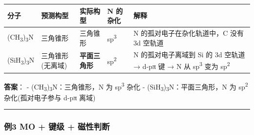 {\def\LTcaptype{none} %
\begin{longtable}[]{@{}
  >{\raggedright\arraybackslash}p{}
  >{\raggedright\arraybackslash}p{}
  >{\raggedright\arraybackslash}p{}
  >{\centering\arraybackslash}p{}
  >{\raggedright\arraybackslash}p{}@{}}
\toprule\noalign{}
\begin{minipage}[b]{\linewidth}\raggedright
分子
\end{minipage} & \begin{minipage}[b]{\linewidth}\raggedright
预测构型
\end{minipage} & \begin{minipage}[b]{\linewidth}\raggedright
实际构型
\end{minipage} & \begin{minipage}[b]{\linewidth}\centering
N 的杂化
\end{minipage} & \begin{minipage}[b]{\linewidth}\raggedright
解释
\end{minipage} \\
\midrule\noalign{}
\endhead
\bottomrule\noalign{}
\endlastfoot
(CH\textsubscript{3})\textsubscript{3}N & 三角锥形 & 三角锥形 & sp\textsuperscript{3} & N 的孤对电子在杂化轨道中，C 没有 3d 空轨道 \\
(SiH\textsubscript{3})\textsubscript{3}N & 三角锥形(无离域) & \textbf{平面三角形} & sp\textsuperscript{2} & N 的孤对电子离域到 Si 的 3d 空轨道 → d-pπ 键 → N 从 sp\textsuperscript{3} 变为 sp\textsuperscript{2} \\
\end{longtable}
}

\textbf{答案}：
- (CH\textsubscript{3})\textsubscript{3}N：三角锥形，N 为 sp\textsuperscript{3} 杂化
- (SiH\textsubscript{3})\textsubscript{3}N：平面三角形，N 为 sp\textsuperscript{2} 杂化(孤对电子参与 d-pπ 离域)

\begin{center}\rule{0.5\linewidth}{0.5pt}\end{center}

\subsubsection{例3 MO + 键级 + 磁性判断}\label{ux4f8b3-mo-ux952eux7ea7-ux78c1ux6027ux5224ux65ad}

